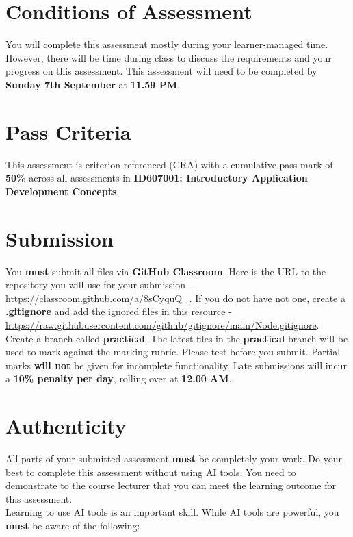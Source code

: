 \documentclass{article}
\begin{document}
\section*{Conditions of Assessment}
You will complete this assessment mostly during your learner-managed time. However, there will be time during class to discuss the requirements and your progress on this assessment. This assessment will need to be completed by \textbf{Sunday 7th September} at \textbf{11.59 PM}. 

\section*{Pass Criteria}
This assessment is criterion-referenced (CRA) with a cumulative pass mark of \textbf{50\%} across all assessments in \textbf{ID607001: Introductory Application Development Concepts}.

\section*{Submission}
You \textbf{must} submit all files via \textbf{GitHub Classroom}. Here is the URL to the repository you will use for your submission – \href{https://classroom.github.com/a/8sCyquQ\_}{https://classroom.github.com/a/8sCyquQ\_}. If you do not have not one, create a \textbf{.gitignore} and add the ignored files in this resource - \href{https://raw.githubusercontent.com/github/gitignore/main/Node.gitignore}{https://raw.githubusercontent.com/github/gitignore/main/Node.gitignore}. \\ 

Create a branch called \textbf{practical}. The latest files in the \textbf{practical} branch will be used to mark against the marking rubric. Please test before you submit. Partial marks \textbf{will not} be given for incomplete functionality. Late submissions will incur a \textbf{10\% penalty per day}, rolling over at \textbf{12.00 AM}.

\section*{Authenticity}
All parts of your submitted assessment \textbf{must} be completely your work. Do your best to complete this assessment without using  AI tools. You need to demonstrate to the course lecturer that you can meet the learning outcome for this assessment. \\
 
Learning to use AI tools is an important skill. While AI tools are powerful, you \textbf{must} be aware of the following:
\end{document}
